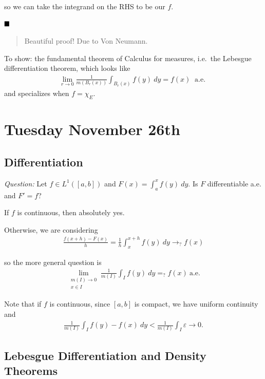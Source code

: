 so we can take the integrand on the RHS to be our \(f\).

\(\qed\)

\begin{quote}
Beautiful proof! Due to Von Neumann.
\end{quote}

To show: the fundamental theorem of Calculus for measures, i.e.~the
Lebesgue differentiation theorem, which looks like
\begin{align*}
\lim_{r\to 0} \frac{1}{m(B_r(x))} \int_{B_r(x)} f(y) ~dy = f(x) ~\text{ a.e. }
\end{align*} and specializes when \(f = \chi_E\).

\hypertarget{tuesday-november-26th}{%
\section{Tuesday November 26th}\label{tuesday-november-26th}}

\hypertarget{differentiation}{%
\subsection{Differentiation}\label{differentiation}}

\emph{Question:} Let \(f\in L^1([a, b])\) and
\(F(x) = \int_a^x f(y) ~dy\). Is \(F\) differentiable a.e. and
\(F' = f\)?

If \(f\) is continuous, then absolutely yes.

Otherwise, we are considering
\begin{align*}
\frac{f(x+h) - F(x)}{h} = \frac{1}{h} \int_x^{x+h} f(y)~dy \to_? f(x)
\end{align*}

so the more general question is
\begin{align*}
\lim_{\substack{m(I) \to 0 \\  x\in I}} \frac{1}{m(I)} \int_I f(y) ~dy =_? f(x) ~\text{a.e.}
\end{align*}

Note that if \(f\) is continuous, since \([a, b]\) is compact, we have
uniform continuity and
\begin{align*}
\frac{1}{m(I)} \int_I f(y) - f(x) ~dy < \frac{1}{m(I)} \int_I \varepsilon \to 0
.\end{align*}

\hypertarget{lebesgue-differentiation-and-density-theorems}{%
\subsection{Lebesgue Differentiation and Density
Theorems}\label{lebesgue-differentiation-and-density-theorems}}

